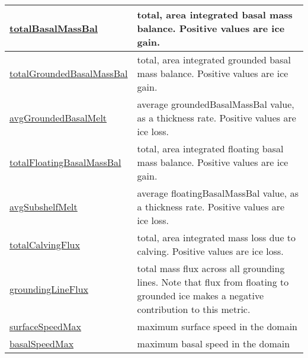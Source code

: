 {\begin{center}
\begin{longtable}{| p{2.0in} | p{4.0in} |}
    \hline
    \hyperref[subsec:var_sec_globalStatsAM_totalBasalMassBal]{totalBasalMassBal} & total, area integrated basal mass balance. Positive values are ice gain. \\
    \hline
    \hyperref[subsec:var_sec_globalStatsAM_totalGroundedBasalMassBal]{totalGroundedBasalMassBal} & total, area integrated grounded basal mass balance. Positive values are ice gain. \\
    \hline
    \hyperref[subsec:var_sec_globalStatsAM_avgGroundedBasalMelt]{avgGroundedBasalMelt} & average groundedBasalMassBal value, as a thickness rate. Positive values are ice loss. \\
    \hline
    \hyperref[subsec:var_sec_globalStatsAM_totalFloatingBasalMassBal]{totalFloatingBasalMassBal} & total, area integrated floating basal mass balance. Positive values are ice gain. \\
    \hline
    \hyperref[subsec:var_sec_globalStatsAM_avgSubshelfMelt]{avgSubshelfMelt} & average floatingBasalMassBal value, as a thickness rate. Positive values are ice loss. \\
    \hline
    \hyperref[subsec:var_sec_globalStatsAM_totalCalvingFlux]{totalCalvingFlux} & total, area integrated mass loss due to calving. Positive values are ice loss. \\
    \hline
    \hyperref[subsec:var_sec_globalStatsAM_groundingLineFlux]{groundingLineFlux} & total mass flux across all grounding lines.  Note that flux from floating to grounded ice makes a negative contribution to this metric. \\
    \hline
    \hyperref[subsec:var_sec_globalStatsAM_surfaceSpeedMax]{surfaceSpeedMax} & maximum surface speed in the domain \\
    \hline
    \hyperref[subsec:var_sec_globalStatsAM_basalSpeedMax]{basalSpeedMax} & maximum basal speed in the domain \\
    \hline
\end{longtable}
\end{center}
}
